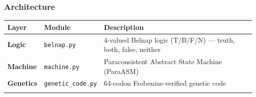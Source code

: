 \documentclass[12pt,a4paper]{article}
\begin{document}
\hypertarget{architecture}{%
\subsubsection{Architecture}\label{architecture}}

\begin{longtable}[]{@{}lll@{}}
\toprule
\begin{minipage}[b]{0.23\columnwidth}\raggedright
Layer\strut
\end{minipage} & \begin{minipage}[b]{0.26\columnwidth}\raggedright
Module\strut
\end{minipage} & \begin{minipage}[b]{0.42\columnwidth}\raggedright
Description\strut
\end{minipage}\tabularnewline
\midrule
\endhead
\begin{minipage}[t]{0.23\columnwidth}\raggedright
\textbf{Logic}\strut
\end{minipage} & \begin{minipage}[t]{0.26\columnwidth}\raggedright
\texttt{belnap.py}\strut
\end{minipage} & \begin{minipage}[t]{0.42\columnwidth}\raggedright
4-valued Belnap logic (T/B/F/N) --- truth, both, false, neither\strut
\end{minipage}\tabularnewline
\begin{minipage}[t]{0.23\columnwidth}\raggedright
\textbf{Machine}\strut
\end{minipage} & \begin{minipage}[t]{0.26\columnwidth}\raggedright
\texttt{machine.py}\strut
\end{minipage} & \begin{minipage}[t]{0.42\columnwidth}\raggedright
Paraconsistent Abstract State Machine (ParaASM)\strut
\end{minipage}\tabularnewline
\begin{minipage}[t]{0.23\columnwidth}\raggedright
\textbf{Genetics}\strut
\end{minipage} & \begin{minipage}[t]{0.26\columnwidth}\raggedright
\texttt{genetic\_code.py}\strut
\end{minipage} & \begin{minipage}[t]{0.42\columnwidth}\raggedright
64-codon Frobenius-verified genetic code\strut
\end{minipage}\tabularnewline
\begin{minipage}[t]{0.23\columnwidth}\raggedright

\end{minipage}
\end{longtable}
\end{document}
